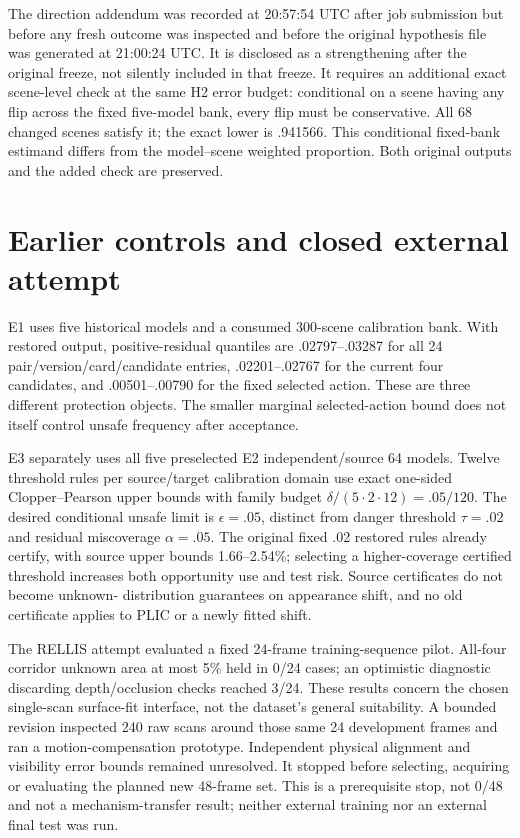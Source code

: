The direction addendum was recorded at 20:57:54 UTC after job submission but
before any fresh outcome was inspected and before the original hypothesis file
was generated at 21:00:24 UTC. It is disclosed as a strengthening after the
original freeze, not silently included in that freeze. It requires an additional
exact scene-level check at the same H2 error budget: conditional on a scene
having any flip across the fixed five-model bank, every flip must be conservative.
All 68 changed scenes satisfy it; the exact lower is .941566. This conditional
fixed-bank estimand differs from the model--scene weighted proportion. Both
original outputs and the added check are preserved.

\section{Earlier controls and closed external attempt}
\label{app:earlier}
E1 uses five historical models and a consumed 300-scene calibration bank. With
restored output, positive-residual quantiles are .02797--.03287 for all 24
pair/version/card/candidate entries, .02201--.02767 for the current four
candidates, and .00501--.00790 for the fixed selected action. These are three
different protection objects. The smaller marginal selected-action bound does
not itself control unsafe frequency after acceptance.

E3 separately uses all five preselected E2 independent/source 64 models. Twelve
threshold rules per source/target calibration domain use exact one-sided
Clopper--Pearson upper bounds with family budget
$\delta/(5\cdot 2\cdot 12)=.05/120$. The desired conditional unsafe limit is
$\epsilon=.05$, distinct from danger threshold $\tau=.02$ and residual miscoverage
$\alpha=.05$. The original fixed .02 restored rules already certify, with source
upper bounds 1.66--2.54\%; selecting a higher-coverage certified threshold increases
both opportunity use and test risk. Source certificates do not become unknown-
distribution guarantees on appearance shift, and no old certificate applies to
PLIC or a newly fitted shift.

The RELLIS attempt evaluated a fixed 24-frame training-sequence pilot. All-four
corridor unknown area at most 5\% held in 0/24 cases; an optimistic diagnostic
discarding depth/occlusion checks reached 3/24. These results concern the chosen
single-scan surface-fit interface, not the dataset's general suitability. A
bounded revision inspected 240 raw scans around those same 24 development frames
and ran a motion-compensation prototype. Independent physical alignment and
visibility error bounds remained unresolved. It stopped before selecting,
acquiring or evaluating the planned new 48-frame set. This is a prerequisite
stop, not 0/48 and not a mechanism-transfer result; neither external training nor
an external final test was run.

